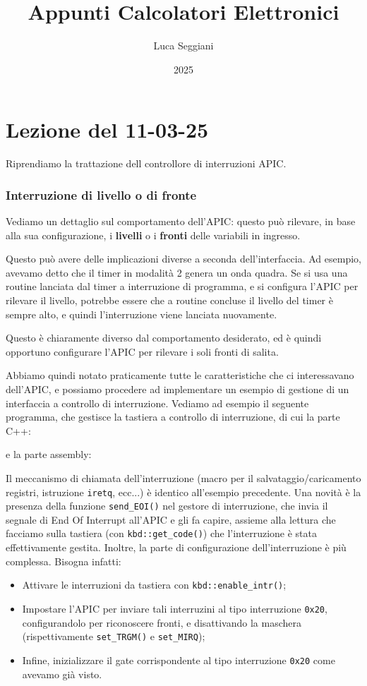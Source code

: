 \documentclass[a4paper,11pt]{article}
\title{Appunti Calcolatori Elettronici}
\author{Luca Seggiani}
\date{2025}
\begin{document}
\section{Lezione del 11-03-25}

\thispagestyle{empty}
\pagestyle{fancy}

Riprendiamo la trattazione dell controllore di interruzioni APIC.

\subsubsection{Interruzione di livello o di fronte}
Vediamo un dettaglio sul comportamento dell'APIC: questo può rilevare, in base alla sua configurazione, i \textbf{livelli} o i \textbf{fronti} delle variabili in ingresso.

Questo può avere delle implicazioni diverse a seconda dell'interfaccia.
Ad esempio, avevamo detto che il timer in modalità 2 genera un onda quadra.
Se si usa una routine lanciata dal timer a interruzione di programma, e si configura l'APIC per rilevare il livello, potrebbe essere che a routine concluse il livello del timer è sempre alto, e quindi l'interruzione viene lanciata nuovamente.

Questo è chiaramente diverso dal comportamento desiderato, ed è quindi opportuno configurare l'APIC per rilevare i soli fronti di salita.

\par\medskip

Abbiamo quindi notato praticamente tutte le caratteristiche che ci interessavano dell'APIC, e possiamo procedere ad implementare un esempio di gestione di un interfaccia a controllo di interruzione.
Vediamo ad esempio il seguente programma, che gestisce la tastiera a controllo di interruzione, di cui la parte C++:
\lstset{style=codestyle, language=C++}

e la parte assembly:
\lstset{style=codestyle, language=assembler}


Il meccanismo di chiamata dell'interruzione (macro per il salvataggio/caricamento registri, istruzione \lstinline|iretq|, ecc...) è identico all'esempio precedente.
Una novità è la presenza della funzione \lstinline|send_EOI()| nel gestore di interruzione, che invia il segnale di End Of Interrupt all'APIC e gli fa capire, assieme alla lettura che facciamo sulla tastiera (con \lstinline|kbd::get_code()|) che l'interruzione è stata effettivamente gestita.
Inoltre, la parte di configurazione dell'interruzione è più complessa.
Bisogna infatti:
\begin{itemize}
	\item Attivare le interruzioni da tastiera con \lstinline|kbd::enable_intr()|;
	\item Impostare l'APIC per inviare tali interruzini al tipo interruzione \lstinline|0x20|, configurandolo per riconoscere fronti, e disattivando la maschera (rispettivamente \lstinline|set_TRGM()| e \lstinline|set_MIRQ|);
	\item Infine, inizializzare il gate corrispondente al tipo interruzione \lstinline|0x20| come avevamo già visto.
\end{itemize}
\end{document}

